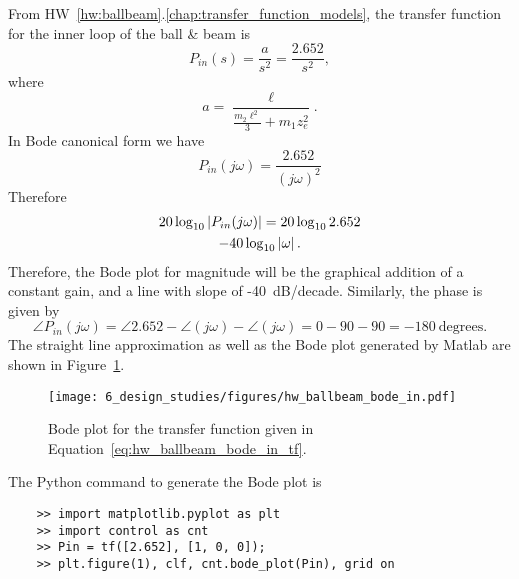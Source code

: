 From HW~\ref{hw:ballbeam}.\ref{chap:transfer_function_models}, the transfer function for the inner loop of the ball \& beam is 
\begin{equation}\label{eq:hw_ballbeam_bode_in_tf}
P_{in}(s) = \frac{a}{s^2} = 
\frac{2.652}{s^2},
\end{equation}
where 
\[
a = \frac{\ell}{\frac{m_2\ell^2}{3}+m_1z_e^2}.
\]
In Bode canonical form we have
\[
P_{in}(j\omega) = \frac{2.652}{(j\omega)^2}
\]
Therefore
\begin{multline*} 
20\log_{10}\left|P_{in}(j\omega)\right|=
	20\log_{10} 2.652 \\
	-40\log_{10}\left|\omega\right|.
\end{multline*}
Therefore, the Bode plot for magnitude will be the graphical addition of a constant gain, and a line with slope of -40~dB/decade.
Similarly, the phase is given by
\[
\angle P_{in}(j\omega) = 
	\angle 2.652 
	- \angle (j\omega)
	- \angle (j\omega) = 0 - 90 - 90 = -180~\text{degrees}.
\]
The straight line approximation as well as the Bode plot generated by Matlab are shown in Figure~\ref{fig:hw_ballbeam_bode_in}.
\begin{figure}[H]
   \centering
   \texttt{[image: 6\_design\_studies/figures/hw\_ballbeam\_bode\_in.pdf]}
   \caption{Bode plot for the transfer function given in Equation~\eqref{eq:hw_ballbeam_bode_in_tf}.}
   \label{fig:hw_ballbeam_bode_in}
\end{figure}
The Python command to generate the Bode plot is
\begin{lstlisting}
	>> import matplotlib.pyplot as plt
	>> import control as cnt
	>> Pin = tf([2.652], [1, 0, 0]);
	>> plt.figure(1), clf, cnt.bode_plot(Pin), grid on
\end{lstlisting}

